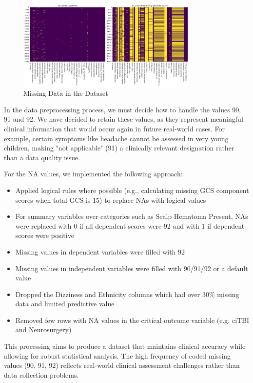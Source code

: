 \documentclass[10pt,letterpaper]{article}
\begin{document}
\begin{figure}[H]
    \centering
    \includegraphics[width=0.8\textwidth]{../figs/missing_values.png} %
    \caption{Missing Data in the Dataset}
    \label{fig:missing_data}
\end{figure}

In the data preprocessing process, we must decide how to handle the values 90, 91 and 92. We have decided to retain these values, as they represent meaningful clinical information that would occur again in future real-world cases. For example, certain symptoms like headache cannot be assessed in very young children, making "not applicable" (91) a clinically relevant designation rather than a data quality issue.

For the NA values, we implemented the following approach:
\begin{itemize}
\item Applied logical rules where possible (e.g., calculating missing GCS component scores when total GCS is 15) to replace NAs with logical values
\item For summary variables over categories such as Scalp Hematoma Present, NAs were replaced with 0 if all dependent scores were 92 and with 1 if dependent scores were positive
\item Missing values in dependent variables were filled with 92
\item Missing values in independent variables were filled with 90/91/92 or a default value 
\item Dropped the Dizziness and Ethnicity columns which had over 30\% missing data and limited predictive value
\item Removed few rows with NA values in the critical outcome variable (e.g. ciTBI and Neurosurgery)
\end{itemize}

This processing aims to produce a dataset that maintains clinical accuracy while allowing for robust statistical analysis. The high frequency of coded missing values (90, 91, 92) reflects real-world clinical assessment challenges rather than data collection problems.
\end{document}
